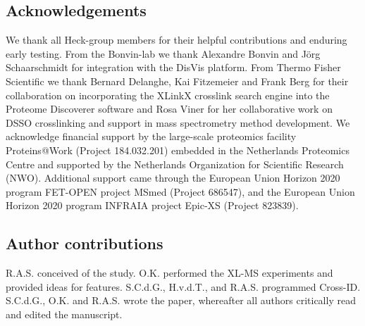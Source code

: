 \subsection{Acknowledgements}
We thank all Heck-group members for their helpful contributions and enduring early testing. From the Bonvin-lab we thank Alexandre Bonvin and Jörg Schaarschmidt for integration with the DisVis platform. From Thermo Fisher Scientific we thank Bernard Delanghe, Kai Fitzemeier and Frank Berg for their collaboration on incorporating the XLinkX crosslink search engine into the Proteome Discoverer software and Rosa Viner for her collaborative work on DSSO crosslinking and support in mass spectrometry method development. We acknowledge financial support by the large-scale proteomics facility Proteins@Work (Project 184.032.201) embedded in the Netherlands Proteomics Centre and supported by the Netherlands Organization for Scientific Research (NWO). Additional support came through the European Union Horizon 2020 program FET-OPEN project MSmed (Project 686547), and the European Union Horizon 2020 program INFRAIA project Epic-XS (Project 823839).

\subsection{Author contributions}
R.A.S. conceived of the study. O.K. performed the XL-MS experiments and provided ideas for features. S.C.d.G., H.v.d.T., and R.A.S. programmed Cross-ID. S.C.d.G., O.K. and R.A.S. wrote the paper, whereafter all authors critically read and edited the manuscript.

